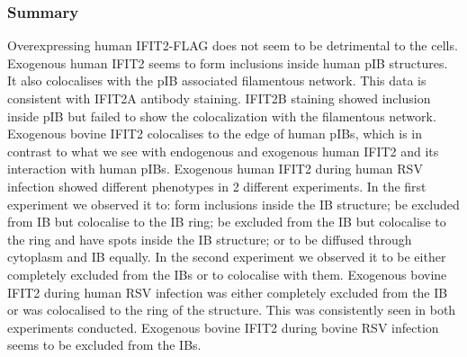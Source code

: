 \subsubsection{Summary} \label{Summary-i2-flag}
Overexpressing human IFIT2-FLAG does not seem to be detrimental to the cells. Exogenous human IFIT2 seems to form inclusions inside human pIB structures. It also colocalises with the pIB associated filamentous network. This data is consistent with IFIT2A antibody staining. IFIT2B staining showed inclusion inside pIB but failed to show the colocalization with the filamentous network. Exogenous bovine IFIT2 colocalises to the edge of human pIBs, which is in contrast to what we see with endogenous and exogenous human IFIT2 and its interaction with human pIBs. Exogenous human IFIT2 during human RSV infection showed different phenotypes in 2 different experiments. In the first experiment we observed it to: form inclusions inside the IB structure; be excluded from IB but colocalise to the IB ring; be excluded from the IB but colocalise to the ring and have spots inside the IB structure; or to be diffused through cytoplasm and IB equally. In the second experiment we observed it to be either completely excluded from the IBs or to colocalise with them. Exogenous bovine IFIT2 during human RSV infection was either completely excluded from the IB or was colocalised to the ring of the structure. This was consistently seen in both experiments conducted. Exogenous bovine IFIT2 during bovine RSV infection seems to be excluded from the IBs.